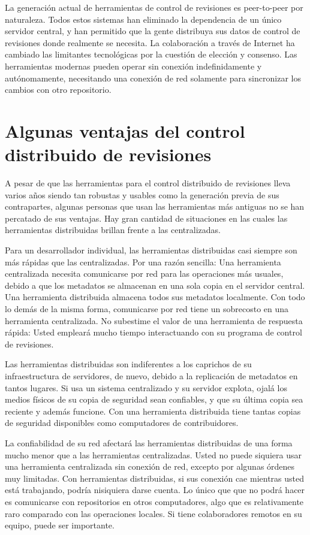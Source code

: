 La generación actual de herramientas de control de revisiones es
peer-to-peer por naturaleza.  Todos estos sistemas han eliminado la
dependencia de un único servidor central, y han permitido que la
gente distribuya sus datos de control de revisiones donde realmente se
necesita. La colaboración a través de Internet ha cambiado las
limitantes tecnológicas por la cuestión de elección y consenso. Las
herramientas modernas pueden operar sin conexión indefinidamente y
autónomamente, necesitando una conexión de red solamente para
sincronizar los cambios con otro repositorio.

\section{Algunas ventajas del control distribuido de revisiones}

A pesar de que las herramientas para el control distribuido de
revisiones lleva varios años siendo tan robustas y usables como la
generación previa de sus contrapartes, algunas personas que usan las
herramientas más antiguas no se han percatado de sus ventajas.  Hay
gran cantidad
de situaciones en las cuales las herramientas distribuidas brillan
frente a las centralizadas.

Para un desarrollador individual, las herramientas distribuidas casi
siempre son más rápidas que las centralizadas. Por una razón sencilla:
Una herramienta centralizada necesita comunicarse por red para las
operaciones más usuales, debido a que los metadatos se almacenan en
una sola copia en el servidor central. Una herramienta distribuida
almacena todos sus metadatos localmente.  Con todo lo demás de la
misma forma, comunicarse por red tiene un sobrecosto en una
herramienta centralizada. No subestime el valor de una herramienta de
respuesta rápida: Usted empleará mucho tiempo interactuando con su
programa de control de revisiones.

Las herramientas distribuidas son indiferentes a los caprichos de su
infraestructura de servidores, de nuevo, debido a la replicación de
metadatos en tantos lugares. Si usa un sistema centralizado y su
servidor explota, ojalá los medios físicos de su copia de seguridad
sean confiables, y que su última copia sea reciente y además
funcione. Con una herramienta distribuida tiene tantas copias de
seguridad disponibles como computadores de contribuidores.

La confiabilidad de su red afectará las herramientas distribuidas de
una forma mucho menor que a las herramientas centralizadas. Usted no puede
siquiera usar una herramienta centralizada sin conexión de red,
excepto por algunas órdenes muy limitadas. Con herramientas
distribuidas, si sus conexión cae mientras usted está trabajando,
podría nisiquiera darse cuenta. Lo único que que no podrá hacer es
comunicarse  con repositorios en otros computadores, algo que es
relativamente raro comparado con las operaciones locales. Si tiene
colaboradores remotos en su equipo, puede ser importante.

